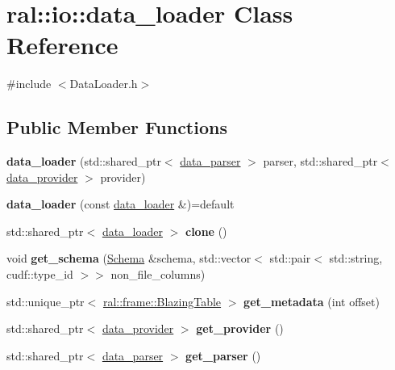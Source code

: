 \hypertarget{classral_1_1io_1_1data__loader}{}\section{ral\+:\+:io\+:\+:data\+\_\+loader Class Reference}
\label{classral_1_1io_1_1data__loader}


{\ttfamily \#include $<$Data\+Loader.\+h$>$}

\subsection*{Public Member Functions}
\begin{DoxyCompactItemize}
\item 
\mbox{\label{classral_1_1io_1_1data__loader_a2f549d77c5c3829b76a27b1db9a577bf}} 
{\bfseries data\+\_\+loader} (std\+::shared\+\_\+ptr$<$ \hyperlink{classral_1_1io_1_1data__parser}{data\+\_\+parser} $>$ parser, std\+::shared\+\_\+ptr$<$ \hyperlink{classral_1_1io_1_1data__provider}{data\+\_\+provider} $>$ provider)
\item 
\mbox{\label{classral_1_1io_1_1data__loader_a1f846c566fd651cf7d41731ad691833c}} 
{\bfseries data\+\_\+loader} (const \hyperlink{classral_1_1io_1_1data__loader}{data\+\_\+loader} \&)=default
\item 
\mbox{\label{classral_1_1io_1_1data__loader_a712792bdb1fbf3e7f06ab032363a4e07}} 
std\+::shared\+\_\+ptr$<$ \hyperlink{classral_1_1io_1_1data__loader}{data\+\_\+loader} $>$ {\bfseries clone} ()
\item 
\mbox{\label{classral_1_1io_1_1data__loader_ad8039b7741f3ccb9ac21a5aa3b90b176}} 
void {\bfseries get\+\_\+schema} (\hyperlink{classral_1_1io_1_1Schema}{Schema} \&schema, std\+::vector$<$ std\+::pair$<$ std\+::string, cudf\+::type\+\_\+id $>$$>$ non\+\_\+file\+\_\+columns)
\item 
\mbox{\label{classral_1_1io_1_1data__loader_ac5b4739744d0b6d0526eeb0a4ebbfb09}} 
std\+::unique\+\_\+ptr$<$ \hyperlink{classral_1_1frame_1_1BlazingTable}{ral\+::frame\+::\+Blazing\+Table} $>$ {\bfseries get\+\_\+metadata} (int offset)
\item 
\mbox{\label{classral_1_1io_1_1data__loader_a1af2abef13bd1427445bae65f2a8d552}} 
std\+::shared\+\_\+ptr$<$ \hyperlink{classral_1_1io_1_1data__provider}{data\+\_\+provider} $>$ {\bfseries get\+\_\+provider} ()
\item 
\mbox{\label{classral_1_1io_1_1data__loader_a15d64ae48a0d068b00a36adf1e17ccce}} 
std\+::shared\+\_\+ptr$<$ \hyperlink{classral_1_1io_1_1data__parser}{data\+\_\+parser} $>$ {\bfseries get\+\_\+parser} ()
\end{DoxyCompactItemize}


